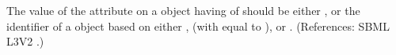 The value of the attribute  on a \Compartment object having
 of  should be either 
, or the identifier of a \UnitDefinition object based on either
,  (with  equal to ), or
.  (References: SBML L3V2
.)
